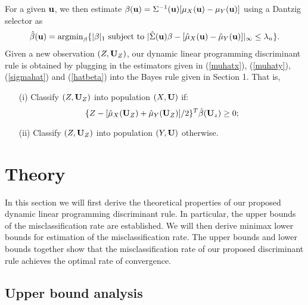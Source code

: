 \documentclass[11pt]{article}
\theoremstyle{definition}
\begin{document}
 For a given ${\bf u}$, we then estimate $\beta({\bf u})=\Sigma^{-1}({\bf u})[\mu_X({\bf u})-\mu_Y({\bf u})]$ using a Dantzig
 selector \citep{candes,Cai} as
 \begin{equation}\label{hatbeta}
 	\hat{\beta}({\bf u})={\rm arg min}_{\beta}\{|\beta|_1 {\rm~subject~to~}|\hat{\Sigma}({\bf u})\beta-[\hat{\mu}_X({\bf u})-\hat{\mu}_Y({\bf u})]|_{\infty}\leq \lambda_n\}.
 \end{equation}
 Given a new observation $(Z,{\bf U}_Z)$, our dynamic linear programming discriminant rule is obtained by plugging in the estimators given in (\ref{muhatx}), (\ref{muhaty}), (\ref{sigmahat}) and (\ref{hatbeta}) into
 the Bayes rule given in Section 1. That is,
 \begin{itemize}
 	\item[(i)] Classify $(Z, {\bf U}_Z)$ into population $(X, {\bf U})$ if:
 	\[\{Z-[\hat{\mu}_X({\bf U}_Z)+\hat{\mu}_Y({\bf U}_Z)]/2\}^T\hat{\beta}({\bf U}_z)\geq 0;\]
 	\item[(ii)] Classify $(Z, {\bf U}_Z)$ into population $(Y, {\bf U})$ otherwise.
 \end{itemize}
 
 
 
 \section{Theory}
 In this section we will first derive the theoretical properties of our proposed dynamic linear programming discriminant rule. In particular, the upper bounds of the misclassification rate are established.
 We will then derive minimax lower bounds for estimation of the misclassification rate. The upper bounds and lower bounds together show that the misclassification rate of our proposed discriminant rule achieves the optimal rate of convergence.
 
 \subsection{Upper bound analysis}
 
\end{document}
